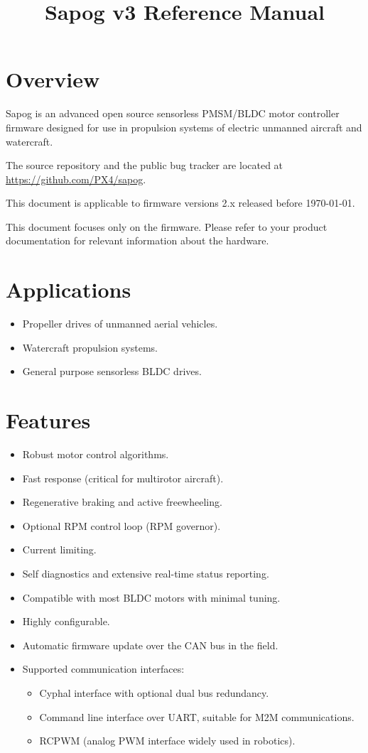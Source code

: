\documentclass{zubaxdoc}
\title{Sapog v3 Reference Manual}
\begin{document}
\frontmatter

\begin{titlepage}
	\section*{Overview}\label{sec:overview}
	
	Sapog is an advanced open source sensorless PMSM/\allowbreak{}BLDC motor controller firmware designed for
	use in propulsion systems of electric unmanned aircraft and watercraft.
	
	The source repository and the public bug tracker are located at
	\url{https://github.com/PX4/sapog}.
	
	This document is applicable to firmware versions 2.x released before \today.
	
	This document focuses only on the firmware.
	Please refer to your product documentation for relevant information about the hardware.
	
	\section*{Applications}
	\begin{itemize}
		\item Propeller drives of unmanned aerial vehicles.
		\item Watercraft propulsion systems.
		\item General purpose sensorless BLDC drives.
	\end{itemize}
	
	\BeginRightColumn
	\section*{Features}
	\begin{itemize}
		\item Robust motor control algorithms.
		\item Fast response (critical for multirotor aircraft).
		\item Regenerative braking and active freewheeling.
		\item Optional RPM control loop (RPM governor).
		\item Current limiting.
		\item Self diagnostics and extensive real-time status reporting.
		\item Compatible with most BLDC motors with minimal tuning.
		\item Highly configurable.
		\item Automatic firmware update over the CAN bus in the field.
		\item Supported communication interfaces:
		\begin{itemize}
			\item Cyphal interface with optional dual bus redundancy.
			\item Command line interface over UART, suitable for M2M communications.
			\item RCPWM (analog PWM interface widely used in robotics).
		\end{itemize}
	\end{itemize}
\end{titlepage}
\end{document}
